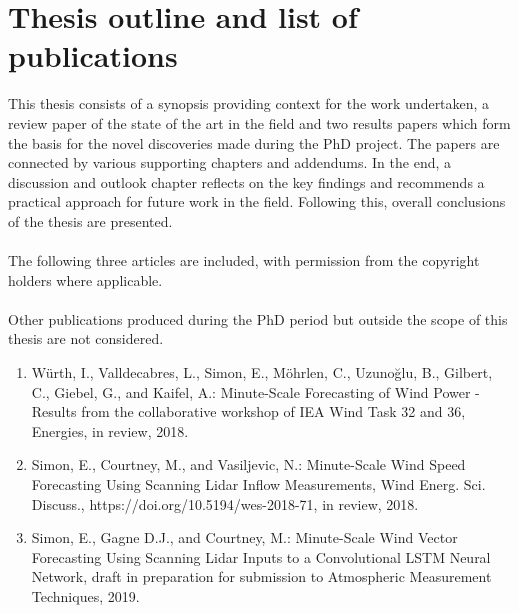 \chapter{Thesis outline and list of publications}
\label{sec:outline}


This thesis consists of a synopsis providing context for the work undertaken, a review paper of the state of the art in the field and two results papers which form the basis for the novel discoveries made during the PhD project. The papers are connected by various supporting chapters and addendums. In the end, a discussion and outlook chapter reflects on the key findings and recommends a practical approach for future work in the field. Following this, overall conclusions of the thesis are presented.
\\\\
The following three articles are included, with permission from the copyright holders where applicable. 
\\\\
Other publications produced during the PhD period but outside the scope of this thesis are not considered.
\\
\begin{enumerate}
    \item W\"urth, I., Valldecabres, L., Simon, E., M\"ohrlen, C., Uzuno\u glu, B., Gilbert, C., Giebel, G., and Kaifel, A.: Minute-Scale Forecasting of Wind Power - Results from the collaborative workshop of IEA Wind Task 32 and 36, Energies, in review, 2018.
    
    \item Simon, E., Courtney, M., and Vasiljevic, N.: Minute-Scale Wind Speed Forecasting Using Scanning Lidar Inflow Measurements, Wind Energ. Sci. Discuss., https://doi.org/10.5194/wes-2018-71, in review, 2018.
    
    \item Simon, E., Gagne D.J., and Courtney, M.: Minute-Scale Wind Vector Forecasting Using Scanning Lidar Inputs to a Convolutional LSTM Neural Network, draft in preparation for submission to Atmospheric Measurement Techniques, 2019.
    
\end{enumerate}